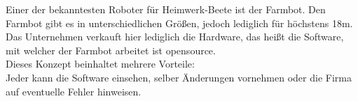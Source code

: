 			Einer der bekanntesten Roboter für Heimwerk-Beete ist der Farmbot. Den Farmbot gibt es in unterschiedlichen Größen, jedoch lediglich für höchstens 18m. Das Unternehmen verkauft hier lediglich die Hardware, das heißt die Software, mit welcher der Farmbot arbeitet ist opensource.\\
			Dieses Konzept beinhaltet mehrere Vorteile:\\
			Jeder kann die Software einsehen, selber Änderungen vornehmen oder die Firma auf eventuelle Fehler hinweisen.
